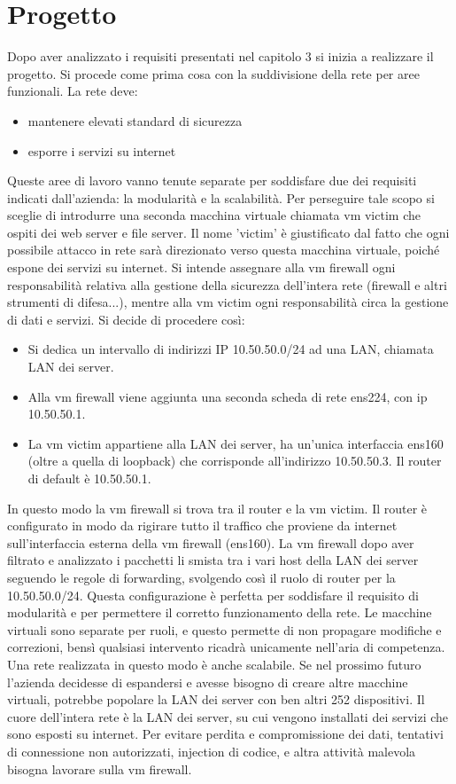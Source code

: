 \section{Progetto}

Dopo aver analizzato i requisiti presentati nel capitolo 3 si inizia a realizzare il progetto. Si procede come prima cosa con la suddivisione della rete per aree funzionali. La rete deve:
\begin{itemize}
    \item  mantenere elevati standard di sicurezza
    \item  esporre i servizi su internet
\end{itemize}
Queste aree di lavoro vanno tenute separate per soddisfare due dei requisiti indicati dall'azienda: la modularità e la scalabilità.
Per perseguire tale scopo si sceglie di introdurre una seconda macchina virtuale chiamata vm victim che ospiti dei web server e file server. Il nome 'victim' è giustificato dal fatto che ogni possibile attacco in rete sarà direzionato verso questa macchina virtuale, poiché espone dei servizi su internet. Si intende assegnare alla vm firewall ogni responsabilità relativa alla gestione della sicurezza dell'intera rete (firewall e altri strumenti di difesa...), mentre alla vm victim ogni responsabilità circa la gestione di dati e servizi.
Si decide di procedere così:
\begin{itemize}
    \item  Si dedica un intervallo di indirizzi IP 10.50.50.0/24 ad una LAN, chiamata LAN dei server.
    \item  Alla vm firewall viene aggiunta una seconda scheda di rete ens224, con ip 10.50.50.1.
    \item La vm victim appartiene alla LAN dei server, ha un'unica interfaccia ens160 (oltre a quella di loopback) che corrisponde all'indirizzo 10.50.50.3.  Il router di default è 10.50.50.1.
\end{itemize}

In questo modo la vm firewall si trova tra il router e la vm victim. Il router è configurato in modo da rigirare tutto il traffico che proviene da internet sull'interfaccia esterna della vm firewall (ens160). La vm firewall dopo aver filtrato e analizzato i pacchetti li smista tra i vari host della LAN dei server seguendo le regole di forwarding, svolgendo così il ruolo di router per la 10.50.50.0/24. Questa configurazione è perfetta per soddisfare il requisito di modularità e per permettere il corretto funzionamento della rete. Le macchine virtuali sono separate per ruoli, e questo permette di non propagare modifiche e correzioni, bensì qualsiasi intervento ricadrà unicamente nell'aria di competenza.
Una rete realizzata in questo modo è anche scalabile. Se nel prossimo futuro l'azienda decidesse di espandersi e avesse bisogno di creare altre macchine virtuali, potrebbe popolare la LAN dei server con ben altri 252 dispositivi.
Il cuore dell'intera rete è la LAN dei server, su cui vengono installati dei servizi che sono esposti su internet. Per evitare perdita e compromissione dei dati, tentativi di connessione non autorizzati, injection di codice, e altra attività malevola bisogna lavorare sulla vm firewall.

